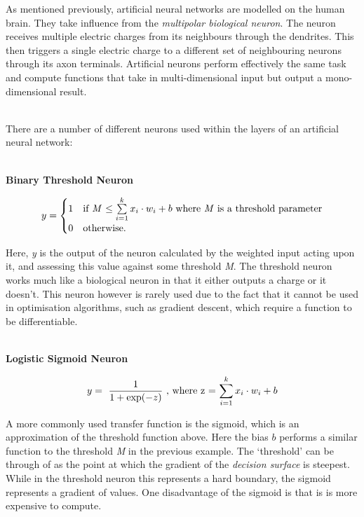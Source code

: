 \documentclass[a4paper,11pt,titlepage]{article}
\begin{document}
		As mentioned previously, artificial neural networks are modelled on the human brain. They take influence from the \textit{multipolar biological neuron}. The neuron receives multiple electric charges from its neighbours through the dendrites. This then triggers a single electric charge to a different set of neighbouring neurons through its axon terminals. Artificial neurons perform effectively the same task and compute functions that take in multi-dimensional input but output a mono-dimensional result.
\\\

There are a number of different neurons used within the layers of an artificial neural network:
		\\\
		
		\textbf{Binary Threshold Neuron} 
		
		$$
		y = \begin{cases}
		1 & \text{if \textit{M} $\le \sum\limits_{i=1}^k x_{i} \cdot w_{i} + b $ where \textit{M} is a threshold parameter} \\
		0 & \text{otherwise.}
		\end{cases}
		$$

		Here, \textit{y} is the output of the neuron calculated by the weighted input acting upon it, and assessing this value against some threshold \textit{M}. The threshold neuron works much like a biological neuron in that it either outputs a charge or it doesn't. This neuron however is rarely used due to the fact that it cannot be used in optimisation algorithms, such as gradient descent, which require a function to be differentiable. 
	\\\

		\textbf{Logistic Sigmoid Neuron}	
		
		$$
		y = 
		\text{ $ \frac{1}{1 + \exp (-z)} $
		, where z = $ \sum\limits_{i=1}^k x_{i} \cdot w_{i} + b $}
		$$ 
		
		A more commonly used transfer function is the sigmoid, which is an approximation of the threshold function above. Here the bias $ b $ performs a similar function to the threshold \textit{M} in the previous example. The `threshold' can be through of as the point at which the gradient of the \textit{decision surface} is steepest. While in the threshold neuron this represents a hard boundary, the sigmoid represents a gradient of values. One disadvantage of the sigmoid is that is is more expensive to compute.
		
\end{document}

